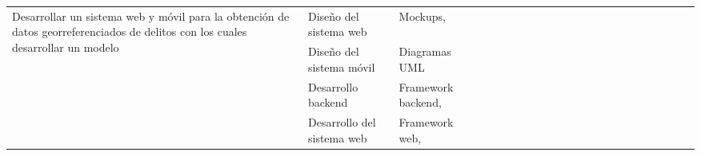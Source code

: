 \begin{landscape}
\begin{ThreePartTable}
\begin{longtable}{|p{}|p{5.5cm}|p{4cm}|l|l|l|l|l|l|l|l|l|l|l|l|l|l|l|l|l|l|l|}
            \hline
            \multirow{4}{0.41\textwidth}{Desarrollar  un sistema web y móvil para la obtención de datos
            georreferenciados de delitos con los cuales desarrollar un modelo}  & Diseño del sistema web                                              & Mockups,                                                                                                            &                                       & \                                     & \cellcolor{green!25}                  & \cellcolor{green!25}                  &                      &                      &                      &                      &                      &                      &                      &                      &                      &                      &                      \\
            \cline{2-2}\cline{4-21}
                                                                                & Diseño del sistema móvil                                            & Diagramas UML                                                                                                       &                                       &                                       & \cellcolor{green!25}                  & \cellcolor{green!25}                  &                      &                      &                      &                      &                      &                      &                      &                      &                      &                      &                      \\
            \cline{2-2}\cline{4-21}
                                                                                & Desarrollo backend                                                  & Framework backend,                                                                                                  &                                       &                                       &                                       &                                       & \cellcolor{green!25} & \cellcolor{green!25} & \cellcolor{green!25} & \cellcolor{green!25} & \cellcolor{green!25} & \cellcolor{green!25} & \cellcolor{green!25} &                      &                      &                      &                      \\
            \cline{2-2}\cline{4-21}
                                                                                & Desarrollo del sistema web                                          & Framework web,                                                                                                      &                                       &                                       &                                       &                                       & \cellcolor{green!25} & \cellcolor{green!25} & \cellcolor{green!25} & \cellcolor{green!25} &                      &                      &                      &                      &                      &                      &                      \\

\end{longtable}
\end{ThreePartTable}
\end{landscape}
